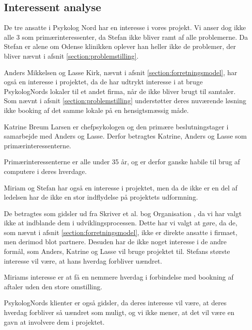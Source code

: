 \subsection{Interessent analyse}

De tre ansatte i Psykolog Nord har en interesse i vores projekt. Vi anser dog ikke alle 3 som primærinteressenter, da Stefan ikke bliver ramt af alle problemerne.
Da Stefan er alene om Odense klinikken oplever han heller ikke de problemer, der bliver nævnt i afsnit \ref{section:problemstilling}.

Anders Mikkelsen og Lasse Kirk, nævnt i afsnit \ref{section:forretningsmodel}, har også en interesse i projektet, da de har udtrykt interesse i at bruge PsykologNords lokaler til et andet firma, når de ikke bliver brugt til samtaler.
Som nævnt i afsnit \ref{section:problemstilling} understøtter deres nuværende løsning ikke booking af det samme lokale på en hensigtsmæssig måde.

Katrine Breum Larsen er chefpsykologen og den primære beslutningstager i samarbejde med Anders og Lasse.
Derfor betragtes Katrine, Anders og Lasse som primærinteressenterne.

Primærinteressenterne er alle under 35 år, og er derfor ganske habile til brug af computere i deres hverdage.

Miriam og Stefan har også en interesse i projektet, men da de ikke er en del af ledelsen har de ikke en stor indflydelse på projektets udformning.

De betragtes som gidsler ud fra Skriver et al. bog Organisation \cite[s. 435]{interessentanalyse}, da vi har valgt ikke at indblande dem i udviklingsprocessen.
Dette har vi valgt at gøre, da de, som nævnt i afsnit \ref{section:forretningsmodel}, ikke er direkte ansatte i firmaet, men derimod blot partnere.
Desuden har de ikke noget interesse i de andre formål, som Anders, Katrine og Lasse vil bruge projektet til. 
Stefans største interesse vil være, at hans hverdag forbliver uændret.

Miriams interesse er at få en nemmere hverdag i forbindelse med bookning af aftaler uden den store omstilling.

PsykologNords klienter er også gidsler, da deres interesse vil være, at deres hverdag forbliver så uændret som muligt, og vi ikke mener, at det vil være en gavn at involvere dem i projektet.
